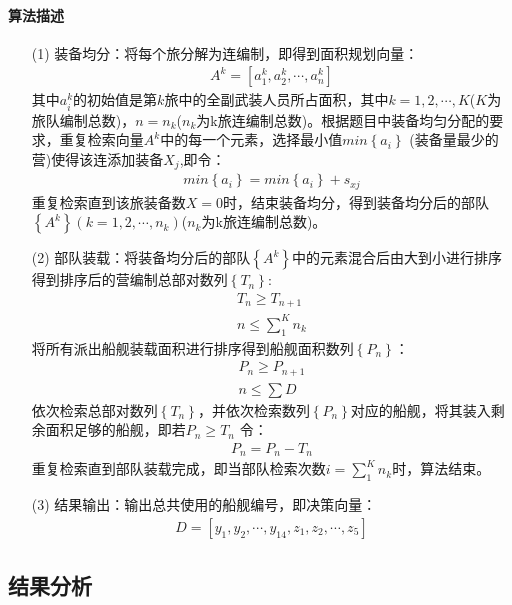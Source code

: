 \documentclass{whutmod}
\begin{document}
	\paragraph{算法描述}
	\begin{itemize}
		\item [(1)] 装备均分：将每个旅分解为连编制，即得到面积规划向量：
		\begin{gather}
		A^k=[a^k_{1},a^k_{2},\cdots,a^k_{n}]
		\end{gather}
		其中$a^k_{i}$的初始值是第$k$旅中的全副武装人员所占面积，其中$k=1,2,\cdots,K$($K$为旅队编制总数)，$n=n_{k}$($n_{k}$为k旅连编制总数)。根据题目中装备均匀分配的要求，重复检索向量$A^k$中的每一个元素，选择最小值$min \left \{ a_{i} \right \}$ (装备量最少的营)使得该连添加装备$X_{j}$,即令：
		\begin{gather}
		min \left \{ a_{i} \right \}=min \left \{ a_{i} \right \}+s_{xj}
		\end{gather}
		重复检索直到该旅装备数$X=0$时，结束装备均分，得到装备均分后的部队$ \left \{A^k\right \}(k=1,2,\cdots,n_{k})$($n_{k}$为k旅连编制总数)。
		\item [(2)] 部队装载：将装备均分后的部队$ \left \{A^k\right \}$中的元素混合后由大到小进行排序得到排序后的营编制总部对数列$ \left \{T_{n}\right \}$:
		\begin{gather}
		T_{n}\geqslant 	T_{n+1}\\
		n\leq \sum_{1}^{K}n_{k}
		\end{gather}
		将所有派出船舰装载面积进行排序得到船舰面积数列$ \left \{P_{n}\right \}$：
		\begin{gather}
		P_{n}\geqslant 	P_{n+1}\\
		n\leq \sum D
		\end{gather}
		依次检索总部对数列$ \left \{T_{n}\right \}$，并依次检索数列$ \left \{P_{n}\right \}$对应的船舰，将其装入剩余面积足够的船舰，即若$P_{n}\geqslant 	T_{n}$ 令：
		\begin{gather}
		P_{n}=	P_{n}-	T_{n}
		\end{gather}
		重复检索直到部队装载完成，即当部队检索次数$i=\sum_{1}^{K}n_{k}$时，算法结束。
		\item [(3)] 结果输出：输出总共使用的船舰编号，即决策向量：
		\begin{gather}
		D=[y_{1},y_{2},\cdots,y_{14},z_{1},z_{2},\cdots,z_{5}]
		\end{gather}
	\end{itemize}      	
	
	
	\subsection{结果分析}
\end{document}
